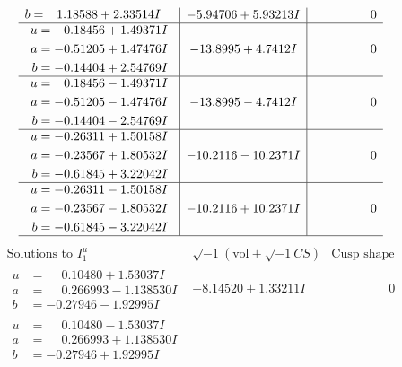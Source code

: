 \documentclass[1p]{elsarticle_modified}
\theoremstyle{definition}
\newcommand{\I}{\sqrt{-1}}
\begin{document}
$$\begin{array}{c|c|c}
\begin{aligned}
b &= \phantom{-}1.18588 + 2.33514 I\end{aligned}
 & -5.94706 + 5.93213 I & \phantom{-0.000000 } 0 \\ \hline\begin{aligned}
u &= \phantom{-}0.18456 + 1.49371 I \\
a &= -0.51205 + 1.47476 I \\
b &= -0.14404 + 2.54769 I\end{aligned}
 & -13.8995 + 4.7412 I & \phantom{-0.000000 } 0 \\ \hline\begin{aligned}
u &= \phantom{-}0.18456 - 1.49371 I \\
a &= -0.51205 - 1.47476 I \\
b &= -0.14404 - 2.54769 I\end{aligned}
 & -13.8995 - 4.7412 I & \phantom{-0.000000 } 0 \\ \hline\begin{aligned}
u &= -0.26311 + 1.50158 I \\
a &= -0.23567 + 1.80532 I \\
b &= -0.61845 + 3.22042 I\end{aligned}
 & -10.2116 - 10.2371 I & \phantom{-0.000000 } 0 \\ \hline\begin{aligned}
u &= -0.26311 - 1.50158 I \\
a &= -0.23567 - 1.80532 I \\
b &= -0.61845 - 3.22042 I\end{aligned}
 & -10.2116 + 10.2371 I & \phantom{-0.000000 } 0\\
 \hline 
 \end{array}$$\newpage$$\begin{array}{c|c|c}  
\text{Solutions to }I^u_{1}& \I (\text{vol} + \sqrt{-1}CS) & \text{Cusp shape}\\
 \hline 
\begin{aligned}
u &= \phantom{-}0.10480 + 1.53037 I \\
a &= \phantom{-}0.266993 - 1.138530 I \\
b &= -0.27946 - 1.92995 I\end{aligned}
 & -8.14520 + 1.33211 I & \phantom{-0.000000 } 0 \\ \hline\begin{aligned}
u &= \phantom{-}0.10480 - 1.53037 I \\
a &= \phantom{-}0.266993 + 1.138530 I \\
b &= -0.27946 + 1.92995 I\end{aligned}

\end{array}$$
\end{document}
